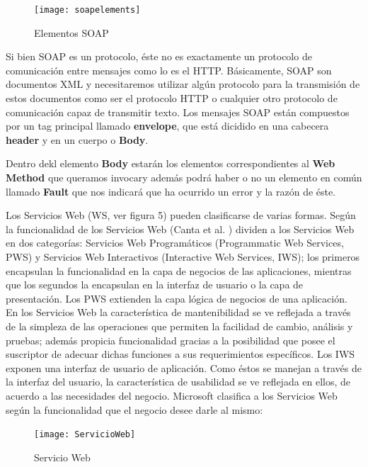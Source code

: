 \documentclass[12pt,letterpaper,titlepage]{article}
\begin{document}
\begin{figure}
  \centering
    \texttt{[image: soapelements]}
  \caption{Elementos SOAP}
  \label{figx:elemsoap}
\end{figure}


Si bien SOAP es un protocolo, éste no es exactamente un protocolo de comunicación entre mensajes como lo es el HTTP. Básicamente, SOAP son documentos XML y necesitaremos utilizar algún protocolo para la transmisión de estos documentos como ser el protocolo HTTP o cualquier otro protocolo de comunicación capaz de transmitir texto. Los mensajes SOAP están compuestos por un tag principal llamado \textbf{envelope}, que está dicidido en una cabecera \textbf{header} y en un cuerpo o \textbf{Body}.

Dentro dekl elemento \textbf{Body} estarán los elementos correspondientes al \textbf{Web Method} que queramos invocary además podrá haber o no un elemento en común llamado \textbf{Fault} que nos indicará que ha ocurrido un error y la razón de éste.



Los Servicios Web (WS, ver figura 5) pueden clasificarse de varias formas. Según la funcionalidad de los Servicios Web (Canta et al. \cite{121}) dividen a los Servicios Web en dos categorías: Servicios Web Programáticos (Programmatic Web Services, PWS) y Servicios Web Interactivos (Interactive Web Services, IWS); los primeros encapsulan la funcionalidad en la capa de negocios de las aplicaciones, mientras que los segundos la encapsulan en la interfaz de usuario o la capa de presentación. Los PWS extienden la capa lógica de negocios de una aplicación. En los Servicios Web la característica de mantenibilidad se ve reflejada a través de la simpleza de las operaciones que permiten la facilidad de cambio, análisis y pruebas; además propicia funcionalidad gracias a la posibilidad que posee el suscriptor de adecuar dichas funciones a sus requerimientos específicos. Los IWS exponen una interfaz de usuario de aplicación. Como éstos se manejan a través de la interfaz del usuario, la característica de usabilidad se ve reflejada en ellos, de acuerdo a las necesidades del negocio. Microsoft \cite{122} clasifica a los Servicios Web según la funcionalidad que el negocio desee darle al mismo:\\


\begin{figure}
  \centering
    \texttt{[image: ServicioWeb]}
  \caption{Servicio Web}
  \label{fig5:SW}
\end{figure}
\end{document}
